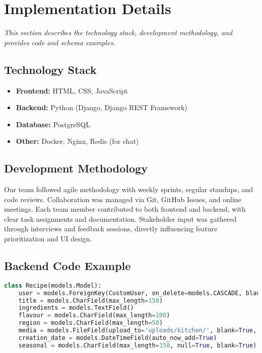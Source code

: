 \documentclass[conference]{IEEEtran}
\begin{document}
\section{Implementation Details}
\textit{This section describes the technology stack, development methodology, and provides code and schema examples.}
\subsection{Technology Stack}
\begin{itemize}
    \item \textbf{Frontend:} HTML, CSS, JavaScript
    \item \textbf{Backend:} Python (Django, Django REST Framework)
    \item \textbf{Database:} PostgreSQL
    \item \textbf{Other:} Docker, Nginx, Redis (for chat)
\end{itemize}

\subsection{Development Methodology}
Our team followed agile methodology with weekly sprints, regular standups, and code reviews. Collaboration was managed via Git, GitHub Issues, and online meetings. Each team member contributed to both frontend and backend, with clear task assignments and documentation. Stakeholder input was gathered through interviews and feedback sessions, directly influencing feature prioritization and UI design.

\subsection{Backend Code Example}
\begin{lstlisting}[language=Python, basicstyle=\scriptsize\ttfamily, caption={Sample Django Model: Recipe}]
class Recipe(models.Model):
    user = models.ForeignKey(CustomUser, on_delete=models.CASCADE, blank=True, null=True)
    title = models.CharField(max_length=150)
    ingredients = models.TextField()
    flavour = models.CharField(max_length=100)
    region = models.CharField(max_length=50)
    media = models.FileField(upload_to='uploads/kitchen/', blank=True, null=True)
    creation_date = models.DateTimeField(auto_now_add=True)
    seasonal = models.CharField(max_length=150, null=True, blank=True)
\end{lstlisting}
\end{document}
